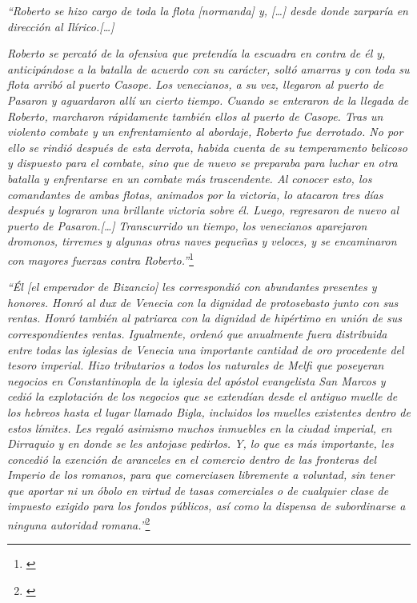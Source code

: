 \textit{“Roberto se hizo cargo de toda la flota [normanda] y, 
[…] desde donde zarparía en dirección al Ilírico.[…]}

\textit{Roberto se percató de la ofensiva que pretendía la escuadra 
en contra 
de él y, anticipándose a la batalla de acuerdo con su carácter, soltó 
amarras y con toda su flota arribó al puerto Casope. Los venecianos, 
a su vez, llegaron al puerto de Pasaron y aguardaron allí un cierto 
tiempo. Cuando se enteraron de la llegada de Roberto, marcharon 
rápidamente también ellos al puerto de Casope. Tras un violento 
combate y un enfrentamiento al abordaje, Roberto fue derrotado. 
No por ello se rindió después de esta derrota, habida cuenta de su 
temperamento belicoso y dispuesto para el combate, sino que de nuevo 
se preparaba para luchar en otra batalla y enfrentarse en un 
combate más trascendente. Al conocer esto, los comandantes de ambas 
flotas, animados por la victoria, lo atacaron tres días después y 
lograron una brillante victoria sobre él. Luego, regresaron de 
nuevo al puerto de Pasaron.[…]
}
\textit{Transcurrido un tiempo, los venecianos aparejaron dromonos, 
tirremes y algunas otras naves pequeñas y veloces, y se 
encaminaron con mayores fuerzas contra Roberto.”}\footnote{\cite[pp.~250--252]{alexiadaVI}}

\textit{“Él [el emperador de Bizancio] les correspondió con 
abundantes presentes y honores.
Honró al dux de Venecia con la dignidad de protosebasto junto con 
sus rentas. Honró también al patriarca con la dignidad de hipértimo en 
unión de sus correspondientes rentas. Igualmente, ordenó que anualmente 
fuera distribuida entre todas las iglesias de Venecia una importante 
cantidad de oro procedente del tesoro imperial. Hizo tributarios a todos los 
naturales de Melfi que poseyeran negocios en Constantinopla de la 
iglesia del apóstol evangelista San Marcos y cedió la explotación de 
los negocios que se extendían desde el antiguo muelle de los hebreos 
hasta el lugar llamado Bigla, incluidos los muelles existentes dentro 
de estos límites. Les regaló asimismo muchos inmuebles en la ciudad 
imperial, en Dirraquio y en donde se les antojase pedirlos. Y, lo que 
es más importante, les concedió la exención de aranceles en el comercio 
dentro de las fronteras del Imperio de los romanos, para que comerciasen 
libremente a voluntad, sin tener que aportar ni un óbolo en virtud de tasas 
comerciales o de cualquier clase de impuesto exigido para los fondos 
públicos, así como la dispensa de subordinarse a ninguna autoridad romana.”}\footnote{\cite[p.~252]{alexiadaVI}}

